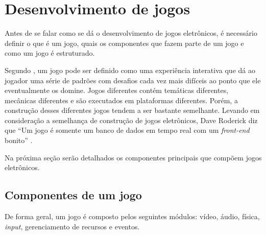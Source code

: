 \section{Desenvolvimento de jogos}

Antes de se falar como se dá o desenvolvimento de jogos eletrônicos, é necessário definir o que é um jogo, quais os componentes que fazem parte de um jogo e como um jogo é estruturado.

Segundo , um jogo pode ser definido como uma experiência interativa que dá ao jogador uma série de padrões com desafios cada vez mais difíceis ao ponto que ele eventualmente os domine. Jogos diferentes contém temáticas diferentes, mecânicas diferentes e são executados em plataformas diferentes. Porém, a construção desses diferentes jogos tendem a ser bastante semelhante. Levando em consideração a semelhança de construção de jogos eletrônicos, Dave Roderick diz que ``Um jogo é somente um banco de dados em tempo real com um \textit{front-end} bonito'' \cite{rollings2004game}.

Na próxima seção serão detalhados os componentes principais que compõem jogos eletrônicos.

\subsection{Componentes de um jogo}

De forma geral, um jogo é composto pelos seguintes módulos: vídeo, áudio, física, \textit{input}, gerenciamento de recursos e eventos.


